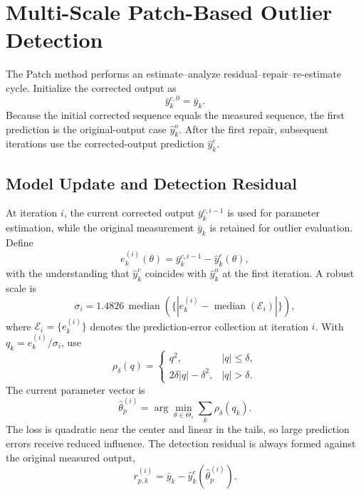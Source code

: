 \documentclass[journal]{IEEEtran}
\newcommand{\med}{\operatorname{median}}
\begin{document}
\section{Multi-Scale Patch-Based Outlier Detection}
The Patch method performs an estimate--analyze residual--repair--re-estimate cycle. Initialize the corrected output as
\begin{equation}
\bar y_k^{c,0}=\bar y_k.
\end{equation}
Because the initial corrected sequence equals the measured sequence, the first prediction is the original-output case $\hat y_k^{o}$. After the first repair, subsequent iterations use the corrected-output prediction $\hat y_k^{c}$.

\subsection{Model Update and Detection Residual}
At iteration $i$, the current corrected output $\bar y_k^{c,i-1}$ is used for parameter estimation, while the original measurement $\bar y_k$ is retained for outlier evaluation. Define
\begin{equation}
e_k^{(i)}(\theta)=\bar y_k^{c,i-1}-\hat y_k^{c}(\theta),
\end{equation}
with the understanding that $\hat y_k^{c}$ coincides with $\hat y_k^{o}$ at the first iteration. A robust scale is
\begin{equation}
\sigma_i=1.4826\,\med\left(\{|e_k^{(i)}-\med(\mathcal E_i)|\}\right),
\end{equation}
where $\mathcal E_i=\{e_k^{(i)}\}$ denotes the prediction-error collection at iteration $i$. With $q_k=e_k^{(i)}/\sigma_i$, use
\begin{equation}
\rho_\delta(q)=\begin{cases}
q^2,&|q|\le\delta,\\
2\delta|q|-\delta^2,&|q|>\delta.
\end{cases}
\end{equation}
The current parameter vector is
\begin{equation}
\hat\theta_p^{(i)}=\arg\min_{\theta\in\Theta_s}\sum_k\rho_\delta(q_k).
\end{equation}
The loss is quadratic near the center and linear in the tails, so large prediction errors receive reduced influence. The detection residual is always formed against the original measured output,
\begin{equation}
r_{p,k}^{(i)}=\bar y_k-\hat y_k^{c}(\hat\theta_p^{(i)}).
\end{equation}
\end{document}
